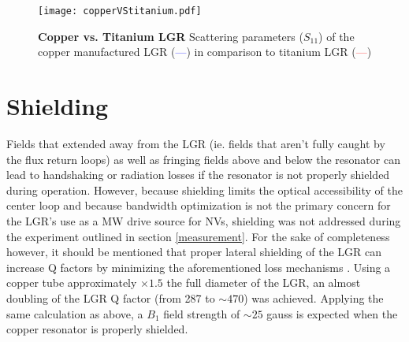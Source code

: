 \begin{figure}[t!]
\centering
\texttt{[image: copperVStitanium.pdf]}  
\caption{\textbf{Copper vs. Titanium LGR} Scattering parameters ($S_{11}$) of the copper manufactured LGR (\textcolor{blue}{---}) in comparison to titanium LGR (\textcolor{red}{---})}
\label{LGR_Coppervstit}
\end{figure} 

\section{Shielding}  

Fields that extended away from the LGR (ie. fields that aren't fully caught by the flux return loops) as well as fringing fields above and below the resonator can lead to handshaking or radiation losses if the resonator is not properly shielded during operation. However, because shielding limits the optical accessibility of the center loop and because bandwidth optimization is not the primary concern for the LGR's use as a MW drive source for NVs, shielding was not addressed during the experiment outlined in section \ref{measurement}. For the sake of completeness however, it should be mentioned that proper lateral shielding of the LGR can increase Q factors by minimizing the aforementioned loss mechanisms \cite{petryakov2001bridged, rinard2005loopgap}. Using a copper tube approximately $\times 1.5$ the full diameter of the LGR, an almost doubling of the LGR Q factor (from 287 to $\sim 470$) was achieved. Applying the same calculation as above, a $B_1$ field strength of $\sim 25$ gauss is expected when the copper resonator is properly shielded.   

\clearpage
\newpage
